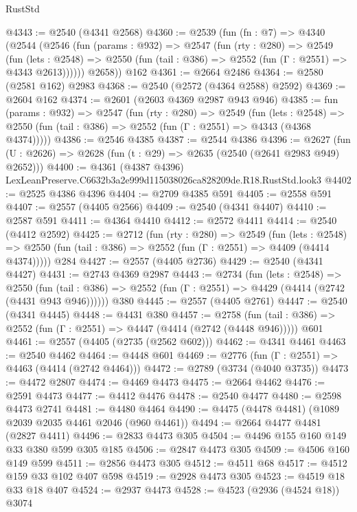 \begin{lexlean}{RustStd}
\begin{coremodule}
@4343 := @2540 (@4341 @2568)
@4360 := @2539
    (fun (fn : @7) =>
    @4340
      (@2544
        (@2546
          (fun (params : @932) =>
          @2547
            (fun (rty : @280) =>
            @2549
              (fun (lets : @2548) =>
              @2550 (fun (tail : @386) => @2552 (fun (Γ : @2551) => @4343 @2613))))))
        @2658))
    @162
@4361 := @2664 @2486
@4364 := @2580 (@2581 @162) @2983
@4368 := @2540 (@2572 (@4364 @2588) @2592)
@4369 := @2604 @162
@4374 := @2601 (@2603 @4369 @2987 @943 @946)
@4385 := fun (params : @932) =>
  @2547
    (fun (rty : @280) =>
    @2549
      (fun (lets : @2548) =>
      @2550 (fun (tail : @386) => @2552 (fun (Γ : @2551) => @4343 (@4368 @4374)))))
@4386 := @2546 @4385
@4387 := @2544 @4386
@4396 := @2627 (fun (U : @2626) => @2628 (fun (t : @29) => @2635 (@2540 (@2641 @2983 @949) @2652)))
@4400 := @4361 (@4387 @4396) LexLeanPreserve.C6632b3a2e999d115038026ca828209de.R18.RustStd.look3
@4402 := @2525 @4386 @4396
@4404 := @2709 @4385 @591
@4405 := @2558 @591
@4407 := @2557 (@4405 @2566)
@4409 := @2540 (@4341 @4407)
@4410 := @2587 @591
@4411 := @4364 @4410
@4412 := @2572 @4411
@4414 := @2540 (@4412 @2592)
@4425 := @2712
    (fun (rty : @280) =>
    @2549
      (fun (lets : @2548) =>
      @2550 (fun (tail : @386) => @2552 (fun (Γ : @2551) => @4409 (@4414 @4374)))))
    @284
@4427 := @2557 (@4405 @2736)
@4429 := @2540 (@4341 @4427)
@4431 := @2743 @4369 @2987
@4443 := @2734
    (fun (lets : @2548) =>
    @2550 (fun (tail : @386) => @2552 (fun (Γ : @2551) => @4429 (@4414 (@2742 (@4431 @943 @946))))))
    @380
@4445 := @2557 (@4405 @2761)
@4447 := @2540 (@4341 @4445)
@4448 := @4431 @380
@4457 := @2758
    (fun (tail : @386) => @2552 (fun (Γ : @2551) => @4447 (@4414 (@2742 (@4448 @946)))))
    @601
@4461 := @2557 (@4405 (@2735 (@2562 @602)))
@4462 := @4341 @4461
@4463 := @2540 @4462
@4464 := @4448 @601
@4469 := @2776 (fun (Γ : @2551) => @4463 (@4414 (@2742 @4464)))
@4472 := @2789 (@3734 (@4040 @3735))
@4473 := @4472 @2807
@4474 := @4469 @4473
@4475 := @2664 @4462
@4476 := @2591 @4473
@4477 := @4412 @4476
@4478 := @2540 @4477
@4480 := @2598 @4473 @2741
@4481 := @4480 @4464
@4490 := @4475 (@4478 @4481) (@1089 @2039 @2035 @4461 @2046 (@960 @4461))
@4494 := @2664 @4477 @4481 (@2827 @4411)
@4496 := @2833 @4473 @305
@4504 := @4496 @155 @160 @149 @33 @380 @599 @305 @185
@4506 := @2847 @4473 @305
@4509 := @4506 @160 @149 @599
@4511 := @2856 @4473 @305
@4512 := @4511 @68
@4517 := @4512 @159 @33 @102 @407 @598
@4519 := @2928 @4473 @305
@4523 := @4519 @18 @33 @18 @407
@4524 := @2937 @4473
@4528 := @4523 (@2936 (@4524 @18)) @3074

\end{coremodule}
\end{lexlean}
